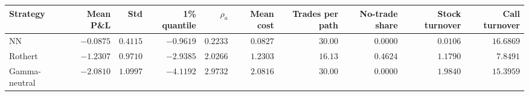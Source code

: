 \begin{tabular}{lrrrrrrrrr}
\toprule
Strategy & Mean P\&L & Std & 1\% quantile & $\rho_a$ & Mean cost & Trades per path & No-trade share & Stock turnover & Call turnover \\
\midrule
NN & $-0.0875$ & $0.4115$ & $-0.9619$ & $0.2233$ & $0.0827$ & $30.00$ & $0.0000$ & $0.0106$ & $16.6869$ \\
Rothert & $-1.2307$ & $0.9710$ & $-2.9385$ & $2.0266$ & $1.2303$ & $16.13$ & $0.4624$ & $1.1790$ & $7.8491$ \\
Gamma-neutral & $-2.0810$ & $1.0997$ & $-4.1192$ & $2.9732$ & $2.0816$ & $30.00$ & $0.0000$ & $1.9840$ & $15.3959$ \\
\bottomrule
\end{tabular}
